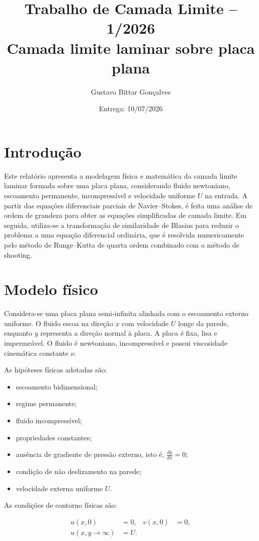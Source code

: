 \documentclass[12pt,a4paper]{article}
\title{Trabalho de Camada Limite -- 1/2026\\
Camada limite laminar sobre placa plana}
\author{Gustavo Bittar Gonçalves}
\date{Entrega: 10/07/2026}
\begin{document}
\maketitle

\section{Introdução}

Este relatório apresenta a modelagem física e matemática da camada limite laminar formada sobre uma placa plana, considerando fluido newtoniano, escoamento permanente, incompressível e velocidade uniforme $U$ na entrada. A partir das equações diferenciais parciais de Navier--Stokes, é feita uma análise de ordem de grandeza para obter as equações simplificadas de camada limite. Em seguida, utiliza-se a transformação de similaridade de Blasius para reduzir o problema a uma equação diferencial ordinária, que é resolvida numericamente pelo método de Runge--Kutta de quarta ordem combinado com o método de shooting.

\section{Modelo físico}

Considera-se uma placa plana semi-infinita alinhada com o escoamento externo uniforme. O fluido escoa na direção $x$ com velocidade $U$ longe da parede, enquanto $y$ representa a direção normal à placa. A placa é fixa, lisa e impermeável. O fluido é newtoniano, incompressível e possui viscosidade cinemática constante $\nu$.

As hipóteses físicas adotadas são:

\begin{itemize}
    \item escoamento bidimensional;
    \item regime permanente;
    \item fluido incompressível;
    \item propriedades constantes;
    \item ausência de gradiente de pressão externo, isto é, $\frac{dp}{dx}=0$;
    \item condição de não deslizamento na parede;
    \item velocidade externa uniforme $U$.
\end{itemize}

As condições de contorno físicas são:

\begin{align}
    u(x,0) &= 0, & v(x,0) &= 0, \\
    u(x,y\rightarrow\infty) &= U.
\end{align}
\end{document}
